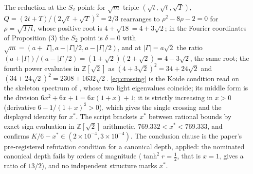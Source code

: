 The reduction at the $S_{2}$ point: for $\sqrt{m}$-triple $(\sqrt{t}, \sqrt{t}, \sqrt{T})$, $Q = (2t + T)/(2\sqrt{t} + \sqrt{T})^{2} = 2/3$ rearranges to $\rho^{2} - 8\rho - 2 = 0$ for $\rho = \sqrt{T/t}$, whose positive root is $4 + \sqrt{18} = 4 + 3\sqrt{2}$; in the Fourier coordinates of Proposition (3) the $S_{2}$ point is $\delta = 0$ with $\sqrt{m} = (a + |\Gamma|, a - |\Gamma|/2, a - |\Gamma|/2)$, and at $|\Gamma| = a\sqrt{2}$ the ratio $(a + |\Gamma|)/(a - |\Gamma|/2) = (1 + \sqrt{2})(2 + \sqrt{2}) = 4 + 3\sqrt{2}$, the same root; the fourth power evaluates in $\mathbb{Z}[\sqrt{2}]$ as $(4+3\sqrt{2})^{2} = 34 + 24\sqrt{2}$ and $(34+24\sqrt{2})^{2} = 2308 + 1632\sqrt{2}$. \eqref{eq:crossing} is the Koide condition read on the skeleton spectrum of , whose two light eigenvalues coincide; its middle form is the division $6x^{2} + 6x + 1 = 6x(1+x) + 1$; it is strictly increasing in $x > 0$ (derivative $6 - 1/(1+x)^{2} > 0$), which gives the single crossing and the displayed identity for $x^{*}$. The script brackets $x^{*}$ between rational bounds by exact sign evaluation in $\mathbb{Z}[\sqrt{2}]$ arithmetic, $769.332 < x^{*} < 769.333$, and confirms $K/6 - x^{*} \in (2 \times 10^{-4}, 3 \times 10^{-4})$. The conclusion clause is the paper's pre-registered refutation condition for a canonical depth, applied: the nominated canonical depth fails by orders of magnitude ($\tanh^{2}r = \tfrac12$, that is $x = 1$, gives a ratio of $13/2$), and no independent structure marks $x^{*}$.
